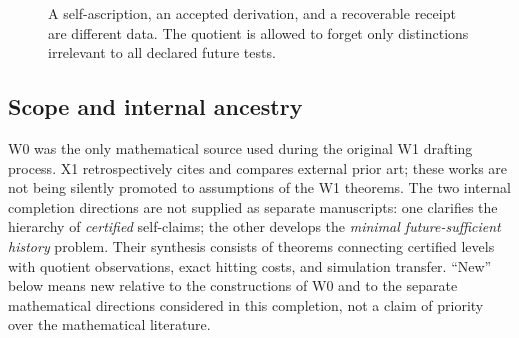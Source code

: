 \documentclass[11pt,letterpaper]{article}
\newcommand{\Ob}{\mathcal{O}}
\newcommand{\Rinf}{\equiv_{\!\infty}}
\begin{document}
\begin{figure}[htbp]\centering
{}
\caption{A self-ascription, an accepted derivation, and a recoverable receipt are different data. The quotient is allowed to forget only distinctions irrelevant to all declared future tests.}\label{fig:pipeline}
\end{figure}

\subsection{Scope and internal ancestry}
W0 was the only mathematical source used during the original W1 drafting process. X1 retrospectively cites and compares external prior art; these works are not being silently promoted to assumptions of the W1 theorems. The two internal completion directions are not supplied as separate manuscripts: one clarifies the hierarchy of \emph{certified} self-claims; the other develops the \emph{minimal future-sufficient history} problem. Their synthesis consists of theorems connecting certified levels with quotient observations, exact hitting costs, and simulation transfer. ``New'' below means new relative to the constructions of W0 and to the separate mathematical directions considered in this completion, not a claim of priority over the mathematical literature.
\end{document}
